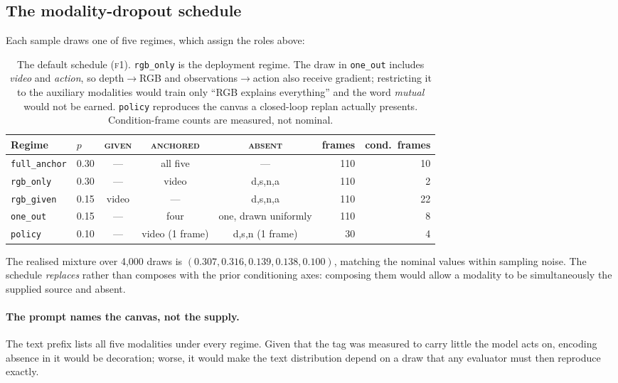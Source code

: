 \documentclass{article}
\begin{document}
\subsection{The modality-dropout schedule}
\label{sec:faxis}

Each sample draws one of five regimes, which assign the roles above:

\begin{table}[t]
\centering
\small
\begin{tabular}{llccc r r}
\toprule
Regime & $p$ & \textsc{given} & \textsc{anchored} & \textsc{absent} & frames & cond.\ frames \\
\midrule
\texttt{full\_anchor} & 0.30 & --- & all five & --- & 110 & 10 \\
\texttt{rgb\_only}    & 0.30 & --- & video & d,s,n,a & 110 & 2 \\
\texttt{rgb\_given}   & 0.15 & video & --- & d,s,n,a & 110 & 22 \\
\texttt{one\_out}     & 0.15 & --- & four & one, drawn uniformly & 110 & 8 \\
\texttt{policy}       & 0.10 & --- & video (1 frame) & d,s,n (1 frame) & 30 & 4 \\
\bottomrule
\end{tabular}
\caption{The default schedule (\textsc{f1}). \texttt{rgb\_only} is the deployment regime. The
draw in \texttt{one\_out} includes \emph{video} and \emph{action}, so depth$\rightarrow$RGB and
observations$\rightarrow$action also receive gradient; restricting it to the auxiliary modalities
would train only ``RGB explains everything'' and the word \emph{mutual} would not be earned.
\texttt{policy} reproduces the canvas a closed-loop replan actually presents. Condition-frame
counts are measured, not nominal.}
\label{tab:faxis}
\end{table}

The realised mixture over 4{,}000 draws is $(0.307, 0.316, 0.139, 0.138, 0.100)$, matching the
nominal values within sampling noise. The schedule \emph{replaces} rather than composes with the
prior conditioning axes: composing them would allow a modality to be simultaneously the supplied
source and absent.

\paragraph{The prompt names the canvas, not the supply.} The text prefix lists all five
modalities under every regime. Given that the tag was measured to carry little the model acts on,
encoding absence in it would be decoration; worse, it would make the text distribution depend on
a draw that any evaluator must then reproduce exactly.
\end{document}
